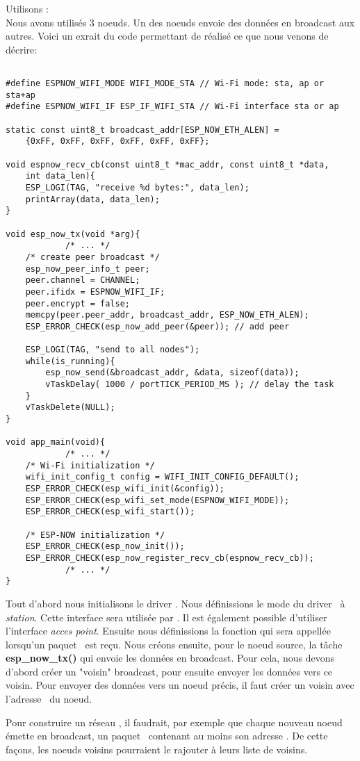         Utilisons \espnow:\\
        Nous avons utilisés 3 noeuds. Un des noeuds envoie des données en broadcast aux autres.
        Voici un exrait du code permettant de réalisé ce que nous venons de décrire:
        \begin{verbatim}

#define ESPNOW_WIFI_MODE WIFI_MODE_STA // Wi-Fi mode: sta, ap or sta+ap
#define ESPNOW_WIFI_IF ESP_IF_WIFI_STA // Wi-Fi interface sta or ap

static const uint8_t broadcast_addr[ESP_NOW_ETH_ALEN] = 
    {0xFF, 0xFF, 0xFF, 0xFF, 0xFF, 0xFF};

void espnow_recv_cb(const uint8_t *mac_addr, const uint8_t *data,
    int data_len){
    ESP_LOGI(TAG, "receive %d bytes:", data_len);
    printArray(data, data_len);
}

void esp_now_tx(void *arg){
            /* ... */
    /* create peer broadcast */
    esp_now_peer_info_t peer;
    peer.channel = CHANNEL;
    peer.ifidx = ESPNOW_WIFI_IF;
    peer.encrypt = false;
    memcpy(peer.peer_addr, broadcast_addr, ESP_NOW_ETH_ALEN);
    ESP_ERROR_CHECK(esp_now_add_peer(&peer)); // add peer

    ESP_LOGI(TAG, "send to all nodes");
    while(is_running){
        esp_now_send(&broadcast_addr, &data, sizeof(data));
        vTaskDelay( 1000 / portTICK_PERIOD_MS ); // delay the task
    }
    vTaskDelete(NULL); 
}

void app_main(void){    
            /* ... */
    /* Wi-Fi initialization */
    wifi_init_config_t config = WIFI_INIT_CONFIG_DEFAULT();    
    ESP_ERROR_CHECK(esp_wifi_init(&config));
    ESP_ERROR_CHECK(esp_wifi_set_mode(ESPNOW_WIFI_MODE));
    ESP_ERROR_CHECK(esp_wifi_start());
    
    /* ESP-NOW initialization */
    ESP_ERROR_CHECK(esp_now_init());
    ESP_ERROR_CHECK(esp_now_register_recv_cb(espnow_recv_cb));
            /* ... */
}
        \end{verbatim}
Tout d'abord nous initialisons le driver \wifi. Nous définissions le mode du driver \wifi\ à
\textit{station}. Cette interface sera utilisée par \espnow. Il est également possible d'utiliser 
l'interface \textit{acces point}. 
Ensuite nous définissions la fonction qui sera appellée lorsqu'un paquet \espnow\ est reçu.
Nous créons ensuite, pour le noeud source, la tâche \textbf{esp\_now\_tx()} qui envoie les données en broadcast.
Pour cela, nous devons d'abord créer un "voisin" broadcast, pour ensuite envoyer les données vers ce voisin.
Pour envoyer des données vers un noeud précis, il faut créer un voisin avec l'adresse \mac\ du noeud.

Pour construire un réseau \mesh, il faudrait, par exemple que chaque nouveau noeud émette en broadcast, un paquet \espnow\ 
contenant au moins son adresse \mac. De cette façons, les noeuds voisins pourraient le rajouter à leurs
liste de voisins.